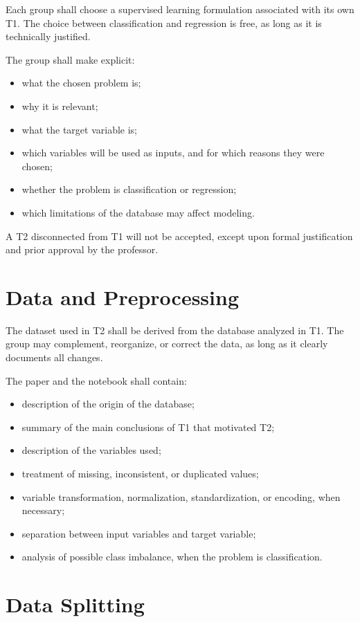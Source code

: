 \documentclass[a4paper]{ifacconf}
\begin{document}
Each group shall choose a supervised learning formulation associated with its own T1. The choice between classification and regression is free, as long as it is technically justified.

The group shall make explicit:
\begin{itemize}
    \item what the chosen problem is;
    \item why it is relevant;
    \item what the target variable is;
    \item which variables will be used as inputs, and for which reasons they were chosen;
    \item whether the problem is classification or regression;
    \item which limitations of the database may affect modeling.
\end{itemize}

A T2 disconnected from T1 will not be accepted, except upon formal justification and prior approval by the professor.

\section{Data and Preprocessing}

The dataset used in T2 shall be derived from the database analyzed in T1. The group may complement, reorganize, or correct the data, as long as it clearly documents all changes.

The paper and the notebook shall contain:
\begin{itemize}
    \item description of the origin of the database;
    \item summary of the main conclusions of T1 that motivated T2;
    \item description of the variables used;
    \item treatment of missing, inconsistent, or duplicated values;
    \item variable transformation, normalization, standardization, or encoding, when necessary;
    \item separation between input variables and target variable;
    \item analysis of possible class imbalance, when the problem is classification.
\end{itemize}


\section{Data Splitting}
\end{document}
